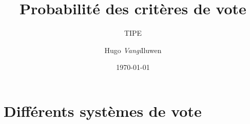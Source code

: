 \documentclass[11pt]{beamer}
\begin{document}
	\author{Hugo \textit{Vangi}lluwen}
	\title{Probabilité des critères de vote}
	\subtitle{TIPE}
	\date{\today}
	\subject{Systèmes de vote}
	
	\begin{frame}[plain]
		\maketitle
	\end{frame}
	
	\begin{frame}
		\small \tableofcontents %
	\end{frame}
	
	\AtBeginSection{
		\begin{frame}
			\small \tableofcontents[currentsection]
		\end{frame}
	}
	
	\section{Différents systèmes de vote}
	
\end{document}
